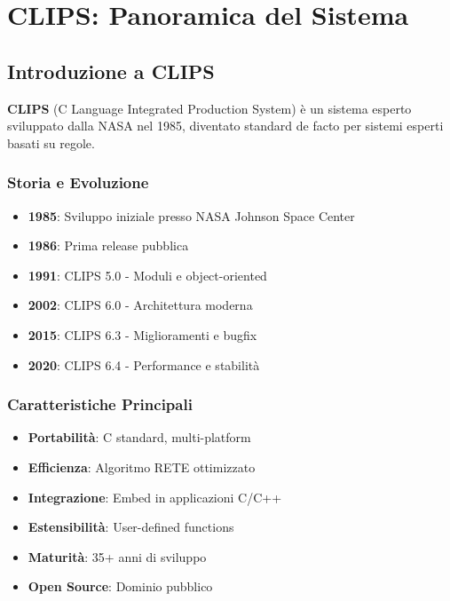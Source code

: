
\chapter{CLIPS: Panoramica del Sistema}
\label{cap:clips_overview}

\section{Introduzione a CLIPS}

\textbf{CLIPS} (C Language Integrated Production System) è un sistema esperto sviluppato dalla NASA nel 1985, diventato standard de facto per sistemi esperti basati su regole.

\subsection{Storia e Evoluzione}

\begin{itemize}
\item \textbf{1985}: Sviluppo iniziale presso NASA Johnson Space Center
\item \textbf{1986}: Prima release pubblica
\item \textbf{1991}: CLIPS 5.0 - Moduli e object-oriented
\item \textbf{2002}: CLIPS 6.0 - Architettura moderna
\item \textbf{2015}: CLIPS 6.3 - Miglioramenti e bugfix
\item \textbf{2020}: CLIPS 6.4 - Performance e stabilità
\end{itemize}

\subsection{Caratteristiche Principali}

\begin{infobox}
\begin{itemize}
\item \textbf{Portabilità}: C standard, multi-platform
\item \textbf{Efficienza}: Algoritmo RETE ottimizzato
\item \textbf{Integrazione}: Embed in applicazioni C/C++
\item \textbf{Estensibilità}: User-defined functions
\item \textbf{Maturità}: 35+ anni di sviluppo
\item \textbf{Open Source}: Dominio pubblico
\end{itemize}
\end{infobox}

